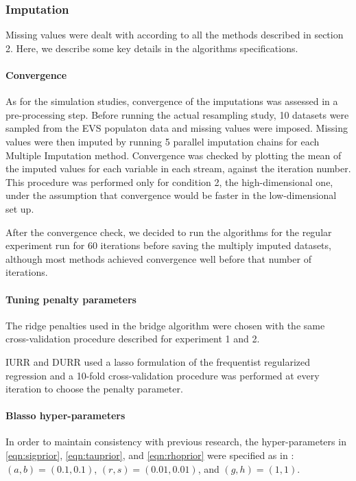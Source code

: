 \subsubsection{Imputation}
	
	Missing values were dealt with according to all the methods described in section 2.
	Here, we describe some key details in the algorithms specifications.

	\paragraph{Convergence}

	As for the simulation studies, convergence of the imputations was assessed in a pre-processing step.
	Before running the actual resampling study, 10 datasets were sampled from the EVS populaton data and missing 
	values were imposed.
	Missing values were then imputed by running 5 parallel imputation chains for each Multiple Imputation 
	method.
	Convergence was checked by plotting the mean of the imputed values for each variable in each stream, against the 
	iteration number.
	This procedure was performed only for condition 2, the high-dimensional one, under the assumption that convergence
	would be faster in the low-dimensional set up.

	After the convergence check, we decided to run the algorithms for the regular experiment run for 60 iterations 
	before saving the multiply imputed datasets, although most methods achieved convergence well before that number 
	of iterations.

	\paragraph{Tuning penalty parameters}

	The ridge penalties used in the bridge algorithm were chosen with the same cross-validation procedure 
	described for experiment 1 and 2.
		
	IURR and DURR used a lasso formulation of the frequentist regularized regression and
	a 10-fold cross-validation procedure was performed at every iteration to choose the penalty parameter.

	\paragraph{Blasso hyper-parameters}

	In order to maintain consistency with previous research, the hyper-parameters in \ref{eqn:sigprior},
	\ref{eqn:tauprior}, and \ref{eqn:rhoprior} were specified as in \cite{zhaoLong:2016}: $(a,b)=(0.1, 0.1)$, 
	$(r,s)=(0.01, 0.01)$, and $(g,h)=(1,1)$.

